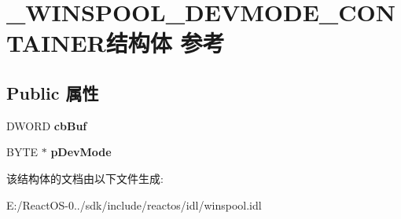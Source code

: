 \hypertarget{struct___w_i_n_s_p_o_o_l___d_e_v_m_o_d_e___c_o_n_t_a_i_n_e_r}{}\section{\+\_\+\+W\+I\+N\+S\+P\+O\+O\+L\+\_\+\+D\+E\+V\+M\+O\+D\+E\+\_\+\+C\+O\+N\+T\+A\+I\+N\+E\+R结构体 参考}
\label{struct___w_i_n_s_p_o_o_l___d_e_v_m_o_d_e___c_o_n_t_a_i_n_e_r}
\subsection*{Public 属性}
\begin{DoxyCompactItemize}
\item 
\mbox{\label{struct___w_i_n_s_p_o_o_l___d_e_v_m_o_d_e___c_o_n_t_a_i_n_e_r_a7581fa9e33292ef86e88145cb4d7c840}} 
D\+W\+O\+RD {\bfseries cb\+Buf}
\item 
\mbox{\label{struct___w_i_n_s_p_o_o_l___d_e_v_m_o_d_e___c_o_n_t_a_i_n_e_r_a28867cca1c9dd1f58c05616e21dcd2d7}} 
B\+Y\+TE $\ast$ {\bfseries p\+Dev\+Mode}
\end{DoxyCompactItemize}


该结构体的文档由以下文件生成\+:\begin{DoxyCompactItemize}
\item 
E\+:/\+React\+O\+S-\/0../sdk/include/reactos/idl/winspool.\+idl\end{DoxyCompactItemize}
